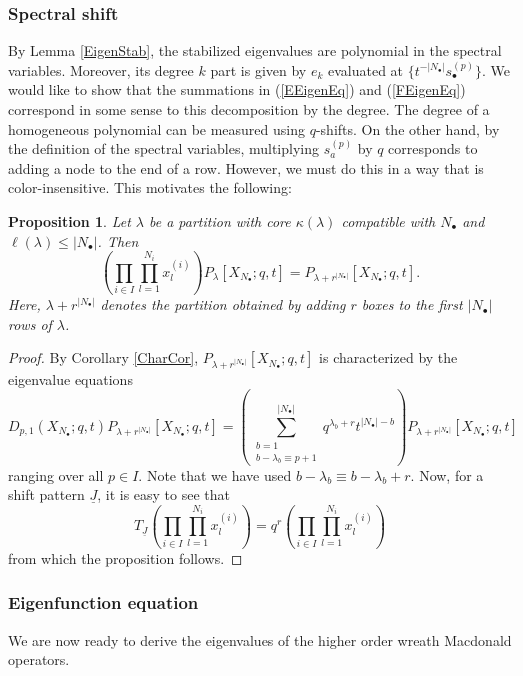 \documentclass{amsart}
\newcommand{\kb}{\kappa}
\newcommand{\Ju}{{\underline{J}}}
\newtheorem{prop}[thm]{Proposition}
\theoremstyle{remark}
\numberwithin{thm}{section}
\numberwithin{equation}{section}
\begin{document}
\subsubsection{Spectral shift}
By Lemma \ref{EigenStab}, the stabilized eigenvalues are polynomial in the spectral variables.
Moreover, its degree $k$ part is given by $e_k$ evaluated at $\{t^{-|N_\bullet|}s^{(p)}_{\bullet}\}$.
We would like to show that the summations in (\ref{EEigenEq}) and (\ref{FEigenEq}) correspond in some sense to this decomposition by the degree.
The degree of a homogeneous polynomial can be measured using $q$-shifts.
On the other hand, by the definition of the spectral variables, multiplying $s^{(p)}_{a}$ by $q$ corresponds to adding a node to the end of a row.
However, we must do this in a way that is color-insensitive.
This motivates the following:
\begin{prop}\label{ShiftProp}
Let $\lambda$ be a partition with core $\kb(\lambda)$ compatible with $N_\bullet$ and $\ell(\lambda)\le|N_\bullet|$.
Then
\[
\left(\prod_{i\in I}\prod_{l=1}^{N_i}x^{(i)}_{l}\right)P_\lambda[X_{N_\bullet}; q,t]=P_{\lambda+r^{|N_\bullet|}}[X_{N_\bullet};q,t].
\]
Here, $\lambda+r^{|N_\bullet|}$ denotes the partition obtained by adding $r$ boxes to the first $|N_\bullet|$ rows of $\lambda$.
\end{prop}

\begin{proof}
By Corollary \ref{CharCor}, $P_{\lambda+r^{|N_\bullet|}}[X_{N_\bullet};q,t]$ is characterized by the eigenvalue equations
\[
D_{p,1}(X_{N_\bullet};q,t)P_{\lambda+r^{|N_\bullet|}}[X_{N_\bullet};q,t]=\left( \sum_{\substack{b=1\\ b-\lambda_b\equiv p+1}}^{|N_\bullet|} q^{\lambda_b+r}t^{|N_\bullet|-b}\right)P_{\lambda+r^{|N_\bullet|}}[X_{N_\bullet};q,t]
\]
ranging over all $p\in I$.
Note that we have used $b-\lambda_b\equiv b-\lambda_b+r$.
Now, for a shift pattern $\Ju$, it is easy to see that
\begin{equation}
T_{\Ju}\left(\prod_{i\in I}\prod_{l=1}^{N_i}x^{(i)}_{l}\right)=q^r\left(\prod_{i\in I}\prod_{l=1}^{N_i}x^{(i)}_{l}\right)
\label{SpecShift}
\end{equation}
from which the proposition follows.
\end{proof}

\subsubsection{Eigenfunction equation}
We are now ready to derive the eigenvalues of the higher order wreath Macdonald operators.
\end{document}
